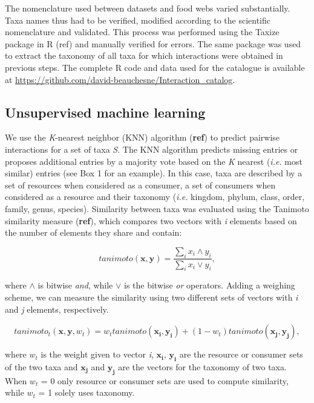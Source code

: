 \documentclass[letterpaper]{article}
\begin{document}
The nomenclature used between datasets and food webs varied substantially. Taxa names thus had to be verified, modified according to the scientific nomenclature and validated. This process was performed using the Taxize package in R (ref) and manually verified for errors. The same package was used to extract the taxonomy of all taxa for which interactions were obtained in previous steps. The complete R code and data used for the catalogue is available at \href{https://github.com/david-beauchesne/Interaction_catalog}{https://github.com/david-beauchesne/Interaction\_catalog}.

  \subsection{Unsupervised machine learning}
We use the \textit{K}-nearest neighbor (KNN) algorithm (\textbf{ref}) to predict pairwise interactions for a set of taxa \textit{S}. The KNN algorithm predicts missing entries or proposes additional entries by a majority vote based on the \textit{K} nearest (\textit{i.e.} most similar) entries (see Box 1 for an example). In this case, taxa are described by a set of resources when considered as a consumer, a set of consumers when considered as a resource and their taxonomy (\textit{i.e.} kingdom, phylum, class, order, family, genus, species). Similarity between taxa was evaluated using the Tanimoto similarity measure (\textbf{ref}), which compares two vectors with \textit{i} elements based on the number of elements they share and contain:

\begin{equation}
  tanimoto(\mathbf{x}, \mathbf{y}) = \frac{\sum_i x_i \land y_i}{\sum_i x_i \lor y_i},
\end{equation}

where $\land$ is bitwise \emph{and}, while $\lor$ is the bitwise \emph{or} operators. Adding a weighing scheme, we can measure the similarity using two different sets of vectors with \textit{i} and \textit{j} elements, respectively.

\begin{equation}
  tanimoto_t(\mathbf{x}, \mathbf{y}, w_t) = w_ttanimoto(\mathbf{x_i}, \mathbf{y_i}) + (1 - w_t)tanimoto(\mathbf{x_j}, \mathbf{y_j}),
\end{equation}

where $w_t$ is the weight given to vector \textit{i}, $\mathbf{x_i}$, $\mathbf{y_i}$ are the resource or consumer sets of the two taxa and $\mathbf{x_j}$ and $\mathbf{y_j}$ are the vectors for the taxonomy of two taxa. When $w_t$ = 0 only resource or consumer sets are used to compute similarity, while $w_t$ = 1 solely uses taxonomy.
\end{document}
